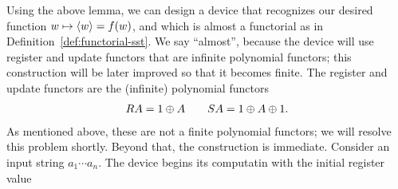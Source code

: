 Using the above lemma, we can design a device that  recognizes our desired function $w \mapsto \langle w \rangle=f(w)$, and which is almost a functorial \sst as in Definition~\ref{def:functorial-sst}. We say ``almost'', because the device will use register and update functors that are  infinite polynomial functors; this construction will be later improved so that it becomes finite.  The register and update functors are the (infinite) polynomial functors
\begin{align*}
\functorr A  = 1 \oplus A \qquad \functors A = 1 \oplus A \oplus 1.
\end{align*}
As mentioned above, these are  not a finite polynomial functors; we will resolve this problem shortly.  
Beyond that, the construction is immediate. Consider an input string 
$a_1 \cdots a_n$. The device begins its computatin with the  initial register value 
